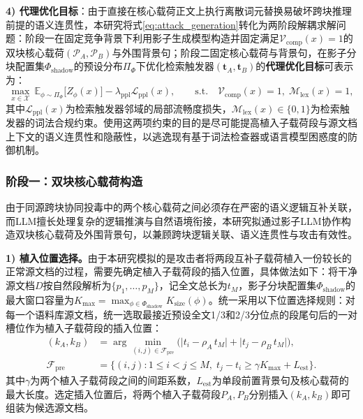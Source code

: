 \textbf{4) 代理优化目标}：由于直接在核心载荷正文上执行离散词元替换易破坏跨块推理前提的语义连贯性，本研究将式\eqref{eq:attack_generation}转化为两阶段解耦求解问题：阶段一在固定竞争背景下利用影子生成模型构造并固定满足$\mathcal V_{\mathrm{comp}}(x)=1$的双块核心载荷$(\mathcal P_A,\mathcal P_B)$与外围背景句；阶段二固定核心载荷与背景句，在影子分块配置集$\Phi_{\mathrm{shadow}}$的预设分布$\Pi_\Phi$下优化检索触发器$(\mathbf t_A,\mathbf t_B)$的\textbf{代理优化目标}可表示为：
\begin{equation}
  \max_{x\in\mathcal X}\ \mathbb E_{\phi\sim\Pi_\Phi}\big[Z_\phi(x)\big]-\lambda_{\mathrm{ppl}}\mathcal L_{\mathrm{ppl}}(x),\qquad
  \text{s.t.}\quad \mathcal V_{\mathrm{comp}}(x)=1,\;\mathcal M_{\mathrm{lex}}(x)=1,
  \label{eq:attack_objective}
\end{equation}
其中$\mathcal L_{\mathrm{ppl}}(x)$为检索触发器邻域的局部流畅度损失，$\mathcal M_{\mathrm{lex}}(x)\in\{0,1\}$为检索触发器的词法合规约束。使用这两项约束的目的是尽可能提高植入子载荷段与源文档上下文的语义连贯性和隐蔽性，以逃逸现有基于词法检查器或语言模型困惑度的防御机制。

\subsubsection{阶段一：双块核心载荷构造}
由于同源跨块协同投毒中的两个核心载荷之间必须存在严密的语义逻辑互补关联，而LLM擅长处理复杂的逻辑推演与自然语境衔接，本研究拟通过影子LLM协作构造双块核心载荷及外围背景句，以兼顾跨块逻辑关联、语义连贯性与攻击有效性。


\textbf{1) 植入位置选择。}由于本研究模拟的是攻击者将两段互补子载荷植入一份较长的正常源文档的过程，需要先确定植入子载荷段的插入位置，具体做法如下：将干净源文档$D$按自然段解析为$\{p_1,\dots,p_M\}$，记全文总长为$t_M$，影子分块配置集$\Phi_{\mathrm{shadow}}$的最大窗口容量为$K_{\max}=\max_{\phi\in\Phi_{\mathrm{shadow}}}K_{\mathrm{size}}(\phi)$。统一采用以下位置选择规则：对每一个语料库源文档，统一选取最接近预设全文1/3和2/3分位点的段尾句后的一对槽位作为植入子载荷段的插入位置：
\begin{equation}
\begin{aligned}
  (k_A,k_B)&=\arg\min_{(i,j)\in\mathcal F_{\mathrm{pre}}}\Big(\big|t_i-\rho_A\,t_M\big|+\big|t_j-\rho_B\,t_M\big|\Big),\\
  \mathcal F_{\mathrm{pre}}&=\big\{(i,j):1\le i<j\le M,\;t_j-t_i\ge\gamma K_{\max}+L_{\mathrm{est}}\big\}.
\end{aligned}
  \label{eq:slot_anchor}
\end{equation}
其中$\gamma$为两个植入子载荷段之间的间距系数，$L_{\mathrm{est}}$为单段前置背景句及核心载荷的最大长度。选定插入位置后，将两个植入子载荷段$P_A,P_B$分别插入$(k_A,k_B)$即可组装为候选源文档。

